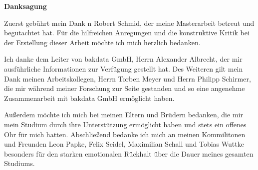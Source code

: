 \vspace*{\fill}
\begin{center}\textsf{\textbf{Danksagung}}\end{center}

\noindent Zuerst gebührt mein Dank n Robert Schmid, der meine Masterarbeit betreut und begutachtet hat. Für die hilfreichen Anregungen und die konstruktive Kritik bei der Erstellung dieser Arbeit möchte ich mich herzlich bedanken.

\noindent Ich danke dem Leiter von bakdata GmbH, Herrn Alexander Albrecht, der mir ausführliche Informationen zur Verfügung gestellt hat. Des Weiteren gilt mein Dank meinen Arbeitskollegen, Herrn Torben Meyer und Herrn Philipp Schirmer, die mir während meiner Forschung zur Seite gestanden und so eine angenehme Zusammenarbeit mit bakdata GmbH ermöglicht haben.

\noindent Außerdem möchte ich mich bei meinen Eltern und Brüdern bedanken, die mir mein Studium durch ihre Unterstützung ermöglicht haben und stets ein offenes Ohr für mich hatten. Abschließend bedanke ich mich an meinen Kommilitonen und Freunden Leon Papke, Felix Seidel, Maximilian Schall und Tobias Wuttke besonders für den starken emotionalen Rückhalt über die Dauer meines gesamten Studiums.

\vspace*{\fill}